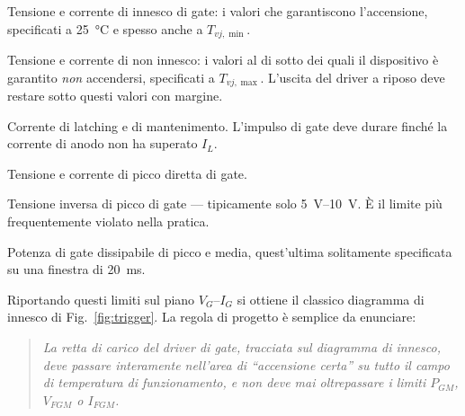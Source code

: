 \documentclass[11pt,a4paper]{article}
\begin{document}
\begin{description}[style=nextline,leftmargin=2.2cm,labelwidth=2cm]
  \item[$V_{GT}$, $I_{GT}$] Tensione e corrente di innesco di gate: i valori che
        garantiscono l'accensione, specificati a \SI{25}{\celsius} e spesso anche a
        $T_{vj,\min}$.
  \item[$V_{GD}$, $I_{GD}$] Tensione e corrente di non innesco: i valori al di sotto
        dei quali il dispositivo è garantito \emph{non} accendersi, specificati a
        $T_{vj,\max}$. L'uscita del driver a riposo deve restare sotto questi valori
        con margine.
  \item[$I_L$, $I_H$] Corrente di latching e di mantenimento. L'impulso di gate deve
        durare finché la corrente di anodo non ha superato $I_L$.
  \item[$V_{FGM}$, $I_{FGM}$] Tensione e corrente di picco diretta di gate.
  \item[$V_{RGM}$] Tensione inversa di picco di gate --- tipicamente solo
        \SIrange{5}{10}{\volt}. È il limite più frequentemente violato nella
        pratica.
  \item[$P_{GM}$, $P_{G(AV)}$] Potenza di gate dissipabile di picco e media,
        quest'ultima solitamente specificata su una finestra di
        \SI{20}{\milli\second}.
\end{description}

Riportando questi limiti sul piano $V_G$--$I_G$ si ottiene il classico diagramma di
innesco di Fig.~\ref{fig:trigger}. La regola di progetto è semplice da enunciare:

\begin{quote}
\emph{La retta di carico del driver di gate, tracciata sul diagramma di innesco,
deve passare interamente nell'area di ``accensione certa'' su tutto il campo di
temperatura di funzionamento, e non deve mai oltrepassare i limiti $P_{GM}$,
$V_{FGM}$ o $I_{FGM}$.}
\end{quote}
\end{document}

